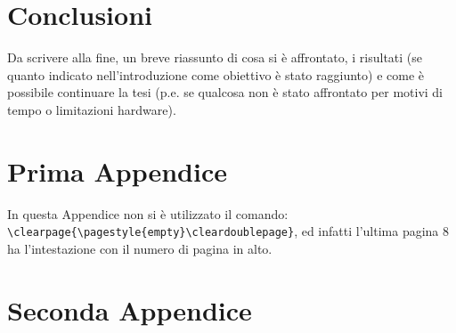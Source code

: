 \documentclass[12pt,a4paper,openright,twoside]{report}
\renewcommand{\chaptermark}[1]{\markboth{\thechapter.\ #1}{}}
\begin{document}
\clearpage{\pagestyle{empty}\cleardoublepage}



\chapter{Conclusioni}

Da scrivere alla fine, un breve riassunto di cosa si \`e affrontato, i risultati (se quanto indicato nell'introduzione come obiettivo \`e stato raggiunto) e come \`e possibile continuare la tesi (p.e. se qualcosa non \`e stato affrontato per motivi di tempo o limitazioni hardware).



\clearpage{\pagestyle{empty}\cleardoublepage}



\renewcommand{\chaptermark}[1]{\markright{\thechapter \ #1}{}}
\lhead[\fancyplain{}{\bfseries\thepage}]{\fancyplain{}{\bfseries\rightmark}}
\appendix %
\chapter{Prima Appendice} %
In questa Appendice non si \`e utilizzato il comando:\\
\verb"\clearpage{\pagestyle{empty}\cleardoublepage}", ed infatti l'ultima pagina 8 ha l'intestazione con il numero di pagina in alto.



\clearpage{\pagestyle{empty}\cleardoublepage}



\chapter{Seconda Appendice}


\clearpage{\pagestyle{empty}\cleardoublepage}
\label{Bibliography}


\end{document}
